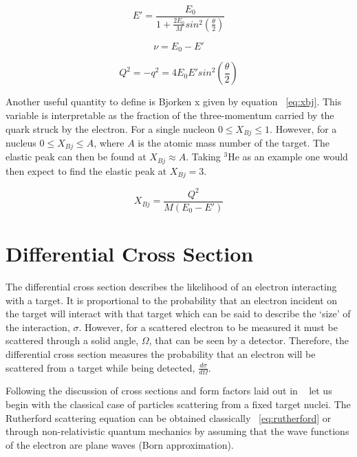 \begin{equation} \label{eq:E'}
	E' = \frac{E_0}{1+\frac{2E_0}{M}sin^2\left(\frac{\theta}{2}\right)}
\end{equation}

\begin{equation} \label{eq:nu}
	\nu = E_0-E'
\end{equation}

\begin{equation} \label{eq:Q^2}
	Q^2 = -q^2 = 4E_0E'sin^2\left(\frac{\theta}{2}\right)
\end{equation}

Another useful quantity to define is Bjorken x given by equation ~\ref{eq:xbj}. This variable is interpretable as the fraction of the three-momentum carried by the quark struck by the electron. For a single nucleon $0 \leq X_{Bj} \leq 1$. However, for a nucleus $0 \leq X_{Bj} \leq A$, where $A$ is the atomic mass number of the target. The elastic peak can then be found at $X_{Bj} \approx A$. Taking $^3$He as an example one would then expect to find the elastic peak at $X_{Bj} = 3$.

\begin{equation} \label{eq:xbj}
	X_{Bj} = \frac{Q^2}{M(E_0-E')} 
\end{equation}

\section{Differential Cross Section}
\label{sec:xs}

The differential cross section describes the likelihood of an electron interacting with a target. It is proportional to the probability that an electron incident on the target will interact with that target which can be said to describe the `size' of the interaction, $\sigma$. However, for a scattered electron to be measured it must be scattered through a solid angle, $\Omega$, that can be seen by a detector. Therefore, the differential cross section measures the probability that an electron will be scattered from a target while being detected, $\frac{d\sigma}{d\Omega}$.

Following the discussion of cross sections and form factors laid out in ~\cite{Book:Povh} let us begin with the classical case of particles scattering from a fixed target nuclei. The Rutherford scattering equation can be obtained classically ~\ref{eq:rutherford} or through non-relativistic quantum mechanics by assuming that the wave functions of the electron are plane waves (Born approximation).   

